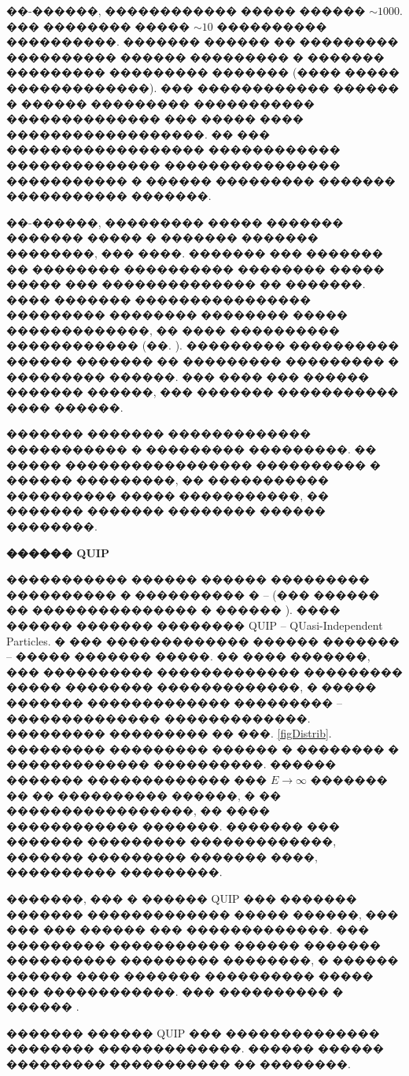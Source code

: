 \documentclass[12pt,titlepage]{article}
\begin{document}
��-������, ������������ ����� ������ $\sim1000$. ��� �������� ����� $\sim10$ ���������� ����������. ������� ������ �� ��������� ���������� ������ ��������� � ������� ��������� ��������� ������� (���� ����� �������������). ��� ������������ ������ � ������ ��������� ����������� �������������� ��� ����� ���� ������������������. �� ��� ������������������ ������������ �������������� ���������������� ����������� � ������ ��������� ������� ����������� �������.

��-������, ��������� ����� ������� ������� ����� � ������� ������� ��������, ��� ����. ������� ��� ������� �� �������� ���������� �������� ����� ����� ��� �������������� �� �������. ���� ������� ���������������� ��������� �������� �������� ����� �������������, �� ���� ���������� ������������ (��. \cite{Tikhonov1975}). ��������� ���������� ������ ������� �� ��������� ��������� � ��������� ������. ��� ���� ��� ������ ������� ������, ��� ������� ����������� ���� ������.

������� ������� ������������� ����������� � ��������� ���������. �� ����� ����������������� ���������� � ������ ���������, �� ����������� ���������� ����� �����������, �� ������� ������� �������� ������ ��������.

\bigskip

\textbf{������ QUIP}

����������� ������ ������ ��������� ���������� � ���������� � \cite{Kalitkin2006} -- \cite{Kalitkin2011} (��� ������ �� ��������������� � ������ \cite{Demura}). ���� ������ ������� �������� QUIP -- QUasi-Independent Particles. � ��� ������������� ������ ������� -- ����� ������� �����. �� ���� �������, ��� ���������� ������������� ��������� ����� �������� �������������, � ����� ������� ������������� ��������� -- �������������� �������������. ��������� ��������� �� ���. \ref{figDistrib}. ��������� ��������� ������ � �������� � ������������� ����������. ������ ������� ������������� ��� $E \to \infty$ ������� �� �� ���������� ������, � �� �����������������, �� ���� ������������ �������. ������� ��� ������� ��������� �������������, ������� ��������� ������� ����, ���������� ���������.

�������, ��� � ������ QUIP ��� ������� ������� ������������� ����� ������, ��� ��� ��� ������ ��� �������������. ��� ��������� ����������� ������ ������� ���������� ��������� ��������, � ������ ������ ���� ������� ���������� ����� ��� ������������. ��� ���������� � ������ {\cite{Demura}}.

������� ������ QUIP ��� �������������� �������� �������������. ������ ������ ��������� ����������� �� ��������.
\end{document}
